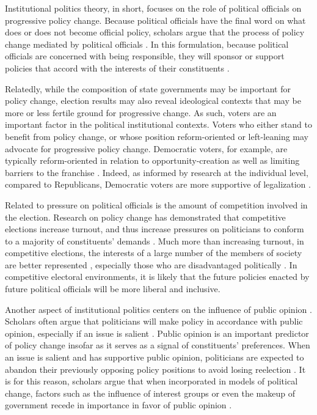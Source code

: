 Institutional politics theory, in short, focuses on the role of political officials on progressive policy change. Because political officials have the final word on what does or does not become official policy, scholars argue that the process of policy change mediated by political officials \citep{amenta_et_al_1994,amenta_2006}. In this formulation, because political officials are concerned with being responsible, they will sponsor or support policies that accord with the interests of their constituents \citep{amenta_and_elliott_2019,page_and_shapiro_1983,mayhew_1974,downs_1957,stimson_et_al_1995}. 

Relatedly, while the composition of state governments may be important for policy change, election results may also reveal ideological contexts that may be more or less fertile ground for progressive change. As such, voters are an important factor in the political institutional contexts. Voters who either stand to benefit from policy change, or whose position reform-oriented or left-leaning may advocate for progressive policy change. Democratic voters, for example, are typically reform-oriented in relation to opportunity-creation as well as limiting barriers to the franchise \citep{amenta_and_poulsen_1996,key_1957,amenta_et_al_2005,hicks_1999,amenta_1998,amenta_et_al_2002}. Indeed, as informed by research at the individual level, compared to Republicans, Democratic voters are more supportive of legalization \citep{rosenthal_and_kubby_1996,caulkins_et_al_2012}. 

Related to pressure on political officials is the amount of competition involved in the election. Research on policy change has demonstrated that competitive elections increase turnout, and thus increase pressures on politicians to conform to a majority of constituents' demands \citep{berry_and_berry_1990,soule_and_olzak_2004,boushey_2016}. Much more than increasing turnout, in competitive elections, the interests of a large number of the members of society are better represented \citep{soule_and_olzak_2004}, especially those who are disadvantaged politically \citep{soule_and_olzak_2004,piven_and_cloward_1977}. In competitive electoral environments, it is likely that the future policies enacted by future political officials will be more liberal and inclusive. 


Another aspect of institutional politics centers on the influence of public opinion \citep{burstein_1998,burstein_2003}. Scholars often argue that politicians will make policy in accordance with public opinion, especially if an issue is salient \citep{pacheco_2012,nicholson-crotty_2009}. Public opinion is an important predictor of policy change insofar as it serves as a signal of constituents' preferences. When an issue is salient and has supportive public opinion, politicians are expected to abandon their previously opposing policy positions to avoid losing reelection \citep{jacobs_and_shapiro_2000,page_and_shapiro_1992}. It is for this reason, scholars argue that when incorporated in models of political change, factors such as the influence of interest groups or even the makeup of government recede in importance in favor of public opinion \citep{burstein_and_linton_2002,burstein_and_hirsh_2007}. 



